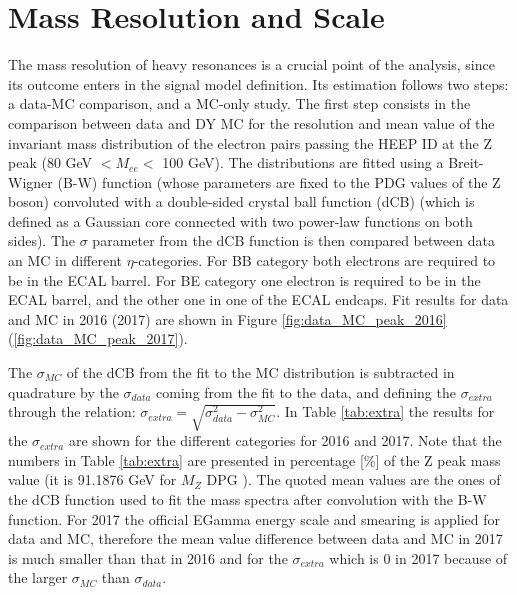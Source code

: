 \section{Mass Resolution and Scale}
\label{sec:mass_res}

The mass resolution of heavy resonances is a crucial point of the analysis, since its outcome enters in the signal model definition. Its estimation follows two steps: a data-MC comparison, and a MC-only study.
The first step consists in the comparison between data and DY MC for the resolution and mean value of the invariant mass distribution of the electron pairs passing the HEEP ID at the Z peak (80 GeV $<M_{ee}<$ 100 GeV).
The distributions are fitted using a Breit-Wigner (B-W) function (whose parameters are fixed to the PDG values of the Z boson) convoluted with a double-sided crystal ball function (dCB) (which is defined as a Gaussian core connected with two power-law functions on both sides).
The $\sigma$ parameter from the dCB function is then compared between data an MC in different $\eta$-categories. For BB category both electrons are required to be in the ECAL barrel. For BE category one electron is required to be in the ECAL barrel, and the other one in one of the ECAL endcaps.
Fit results for data and MC in 2016 (2017) are shown in Figure \ref{fig:data_MC_peak_2016} (\ref{fig:data_MC_peak_2017}).

The $\sigma_{MC}$ of the dCB from the fit to the MC distribution is subtracted in quadrature by the $\sigma_{data}$ coming from the fit to the data, and defining the $\sigma_{extra}$ through the relation: $\sigma_{extra}=\sqrt{\sigma_{data}^{2} - \sigma_{MC}^{2}}$.
In Table \ref{tab:extra} the results for the $\sigma_{extra}$ are shown for the different categories for 2016 and 2017.
Note that the numbers in Table \ref{tab:extra} are presented in percentage [\%] of the Z peak mass value (it is 91.1876 GeV for $M_{Z}$ DPG ). The quoted mean values are the ones of the dCB function used to fit the mass spectra after convolution with the B-W function. For 2017 the official EGamma energy scale and smearing is applied for data and MC, therefore the mean value difference between data and MC in 2017 is much smaller than that in 2016 and for the $\sigma_{extra}$ which is 0 in 2017 because of the larger $\sigma_{MC}$ than $\sigma_{data}$.

